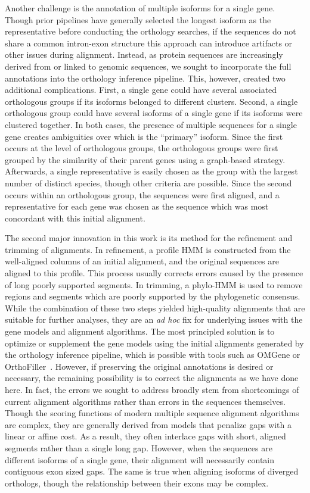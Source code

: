 \documentclass[10pt,letterpaper]{article}
\begin{document}
Another challenge is the annotation of multiple isoforms for a single gene. Though prior pipelines have generally selected the longest isoform as the representative before conducting the orthology searches, if the sequences do not share a common intron-exon structure this approach can introduce artifacts or other issues during alignment. Instead, as protein sequences are increasingly derived from or linked to genomic sequences, we sought to incorporate the full annotations into the orthology inference pipeline. This, however, created two additional complications. First, a single gene could have several associated orthologous groups if its isoforms belonged to different clusters. Second, a single orthologous group could have several isoforms of a single gene if its isoforms were clustered together. In both cases, the presence of multiple sequences for a single gene creates ambiguities over which is the “primary” isoform. Since the first occurs at the level of orthologous groups, the orthologous groups were first grouped by the similarity of their parent genes using a graph-based strategy. Afterwards, a single representative is easily chosen as the group with the largest number of distinct species, though other criteria are possible. Since the second occurs within an orthologous group, the sequences were first aligned, and a representative for each gene was chosen as the sequence which was most concordant with this initial alignment.

The second major innovation in this work is its method for the refinement and trimming of alignments. In refinement, a profile HMM is constructed from the well-aligned columns of an initial alignment, and the original sequences are aligned to this profile. This process usually corrects errors caused by the presence of long poorly supported segments. In trimming, a phylo-HMM is used to remove regions and segments which are poorly supported by the phylogenetic consensus. While the combination of these two steps yielded high-quality alignments that are suitable for further analyses, they are an \textit{ad hoc} fix for underlying issues with the gene models and alignment algorithms. The most principled solution is to optimize or supplement the gene models using the initial alignments generated by the orthology inference pipeline, which is possible with tools such as OMGene or OrthoFiller~\cite{Dunne2018, Dunne2017}. However, if preserving the original annotations is desired or necessary, the remaining possibility is to correct the alignments as we have done here. In fact, the errors we sought to address broadly stem from shortcomings of current alignment algorithms rather than errors in the sequences themselves. Though the scoring functions of modern multiple sequence alignment algorithms are complex, they are generally derived from models that penalize gaps with a linear or affine cost. As a result, they often interlace gaps with short, aligned segments rather than a single long gap. However, when the sequences are different isoforms of a single gene, their alignment will necessarily contain contiguous exon sized gaps. The same is true when aligning isoforms of diverged orthologs, though the relationship between their exons may be complex.
\end{document}
